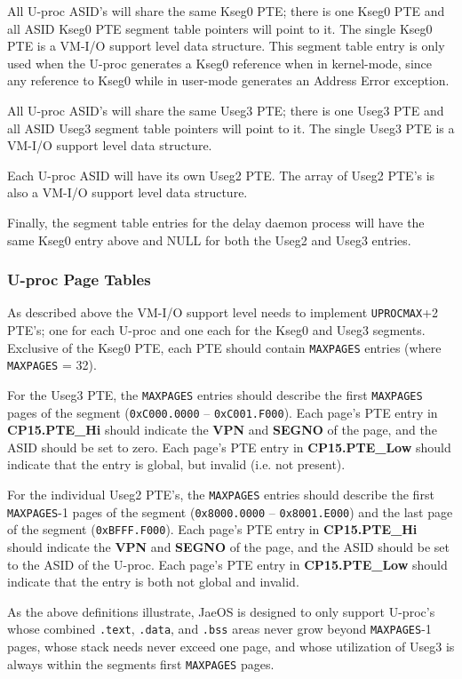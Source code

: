 All U-proc ASID's will share the same Kseg0 PTE; there is one Kseg0 PTE and all ASID Kseg0 PTE segment table pointers will point to it.
The single Kseg0 PTE is a VM-I/O support level data structure. 
This segment table entry is only used when the U-proc generates a Kseg0 reference when in kernel-mode, since any reference to Kseg0 while in user-mode generates an Address Error exception.

All U-proc ASID's will share the same Useg3 PTE; there is one Useg3 PTE and all ASID Useg3 segment table pointers will point to it. 
The single Useg3 PTE is a VM-I/O support level data structure.

Each U-proc ASID will have its own Useg2 PTE. 
The array of Useg2 PTE's is also a VM-I/O support level data structure.

Finally, the segment table entries for the delay daemon process will have the same Kseg0 entry above and NULL for both the Useg2 and Useg3 entries.


\subsubsection{U-proc Page Tables}\label{ssec:upgt}
As described above the VM-I/O support level needs to implement \verb+UPROCMAX++2 PTE's; one for each U-proc and one each for the Kseg0 and Useg3 segments. 
Exclusive of the Kseg0 PTE, each PTE should contain \verb+MAXPAGES+ entries (where \verb+MAXPAGES+ = 32).

For the Useg3 PTE, the \verb+MAXPAGES+ entries should describe the first \verb+MAXPAGES+ pages of the segment (\texttt{0xC000.0000} – \texttt{0xC001.F000}). 
Each page's PTE entry in \textbf{CP15.PTE\_Hi} should indicate the \textbf{VPN} and \textbf{SEGNO} of the page, and the ASID should be set to zero. 
Each page's PTE entry in \textbf{CP15.PTE\_Low} should indicate that the entry is global, but invalid (i.e. not present).

For the individual Useg2 PTE's, the \verb+MAXPAGES+ entries should describe the first \verb+MAXPAGES+-1 pages of the segment (\texttt{0x8000.0000} – \texttt{0x8001.E000}) and the last page of the segment (\texttt{0xBFFF.F000}). 
Each page's PTE entry in \textbf{CP15.PTE\_Hi} should indicate the \textbf{VPN} and \textbf{SEGNO} of the page, and the ASID should be set to the ASID of the U-proc. 
Each page's PTE entry in \textbf{CP15.PTE\_Low} should indicate that the entry is both not global and invalid.

As the above definitions illustrate, JaeOS is designed to only support U-proc's whose combined \texttt{.text}, \texttt{.data}, and \texttt{.bss} areas never grow beyond \verb+MAXPAGES+-1 pages, whose stack needs never exceed one page, and whose utilization of Useg3 is always within the segments first \verb+MAXPAGES+ pages.


